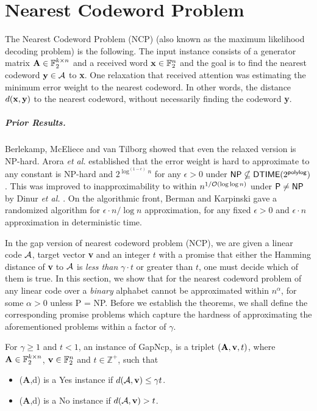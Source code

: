 \chapter{Nearest Codeword Problem} 

The Nearest Codeword Problem (NCP) (also known as the maximum
likelihood decoding problem) is the following.  The input instance
consists of a generator matrix ${\bf A} \in \mathbb{F}_2^{k \times n}$ and
a received word ${\bf x} \in \mathbb{F}^n_2$ and the goal is to find
the nearest codeword ${\bf y} \in {\cal A}$ to {\bf x}. One relaxation that
received attention was estimating the minimum error weight to the
nearest codeword. In other words, the distance $d({\bf x, y})$ to the
nearest codeword, without necessarily finding the codeword {\bf y}.

\paragraph{Prior Results.} Berlekamp, McEliece and van Tilborg
\cite{BMT} showed that even the relaxed version is {\sf
  NP}-hard. Arora {\em et al.} \cite{ABSS} established that the error
weight is hard to approximate to any constant is {\sf NP}-hard and
$2^{\log^{(1-\epsilon)}n}$ for any $\epsilon > 0$ under ${\sf NP}
\nsubseteq {\sf DTIME}(2^{\sf poly log})$. This was improved to
inapproximability to within $n^{1/{\cal O}(\log\log n)}$ under ${\sf
  P} \ne {\sf NP}$ by Dinur {\em et al.} \cite{DKRS}. On the
algorithmic front, Berman and Karpinski \cite{BK} gave a randomized
algorithm for $\epsilon\cdot n/\log n$ approximation, for any fixed $\epsilon >0$
and $\epsilon \cdot n$ approximation in deterministic time.


In the gap version of nearest codeword problem (NCP), we are given a
linear code {${\cal A}$}, target vector {\bf v} and an integer $t$ with a
promise that either the Hamming distance of {\bf v} to ${\cal A}$ is {\em
  less than} $\gamma \cdot t$ or greater than $t$, one must decide
which of them is true. In this section, we show that for the nearest
codeword problem of any linear code over a {\em binary} alphabet
cannot be approximated within $n^\alpha$, for some $\alpha > 0$ unless
{\sf P = NP}. Before we establish the theorems, we shall define the
corresponding promise problems which capture the hardness of
approximating the aforementioned problems within a factor of $\gamma$.

\begin{definition} For $\gamma \ge 1$ and $t
  < 1$, an instance of {\sc GapNcp}$_\gamma$ is a triplet $({\bf A},
  {\bf v}, t)$, where ${\bf A} \in \mathbb{F}_2^{k\times n}$, ${\bf v}
  \in \mathbb{F}_2^{n}$ and $t \in \mathbb{Z}^+$, such that
 \begin{itemize}
\item ({\bf A},d) is a {\sf Yes} instance if $d({\cal A}, {\bf v}) \le \gamma t$.
\item ({\bf A},d) is a {\sf No} instance if $d({\cal A}, {\bf v}) > t$.
 \end{itemize}
\end{definition}

